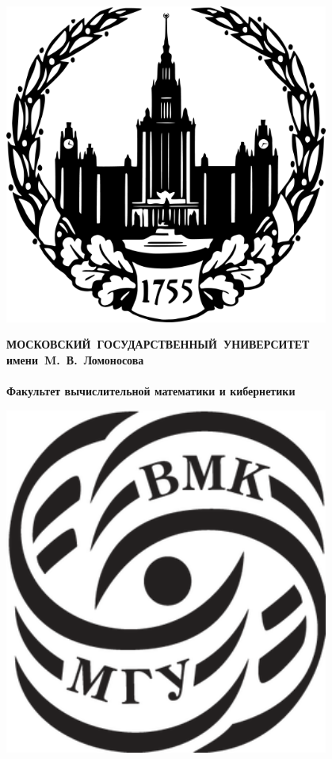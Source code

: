 \documentclass[a4paper,12pt,titlepage,finall]{article}
\begin{document}
\begin{titlepage}
  \begin{center}
      \begin{minipage}{0.10\textwidth}%
          \includegraphics[width=0.8\textwidth]{msu-logo2.png}%
      \end{minipage}\hspace{10pt}
      \begin{minipage}{0.7\textwidth}%
        \small\bf\centering
        МОСКОВСКИЙ~ГОСУДАРСТВЕННЫЙ~УНИВЕРСИТЕТ\\
        имени~M.~В.~Ломоносова\\
        ~\\
        Факультет вычислительной математики и кибернетики
      \end{minipage}\hspace{10pt}
      \begin{minipage}{0.10\textwidth}%
          \includegraphics[width=0.8\textwidth]{cmc-logo.png}%

\end{minipage}
\end{center}
\end{titlepage}
\end{document}
